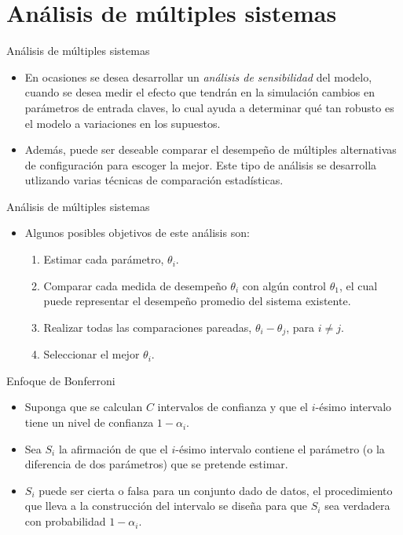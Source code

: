 \section{Análisis de múltiples sistemas}
\begin{frame}{Análisis de múltiples sistemas}
    \begin{itemize}
        \item En ocasiones se desea desarrollar un \textit{análisis de sensibilidad} del modelo, cuando se desea medir el efecto que tendrán en la simulación cambios en parámetros de entrada claves, lo cual ayuda a determinar qué tan robusto es el modelo a variaciones en los supuestos.
        \item Además, puede ser deseable comparar el desempeño de múltiples alternativas de configuración para escoger la mejor. Este tipo de análisis se desarrolla utlizando varias técnicas de comparación estadísticas.
    \end{itemize}
\end{frame}

\begin{frame}{Análisis de múltiples sistemas}
    \begin{itemize}
        \item Algunos posibles objetivos de este análisis son:
        \begin{enumerate}
            \item Estimar cada parámetro, $\theta_i$.
            \item Comparar cada medida de desempeño $\theta_i$ con algún control $\theta_1$, el cual puede representar el desempeño promedio del sistema existente.
            \item Realizar todas las comparaciones pareadas, $\theta_i-\theta_j$, para $i \neq j$.
            \item Seleccionar el mejor $\theta_i$.
        \end{enumerate}
    \end{itemize}
\end{frame}

\begin{frame}{Enfoque de Bonferroni}
    \begin{itemize}
        \item Suponga que se calculan $C$ intervalos de confianza y que el $i$-ésimo intervalo tiene un nivel de confianza $1-\alpha_i$.
        \item Sea $S_i$ la afirmación de que el $i$-ésimo intervalo contiene el parámetro (o la diferencia de dos parámetros) que se pretende estimar.
        \item $S_i$ puede ser cierta o falsa para un conjunto dado de datos, el procedimiento que lleva a la construcción del intervalo se diseña para que $S_i$ sea verdadera con probabilidad $1-\alpha_i$.
    \end{itemize}
\end{frame}

